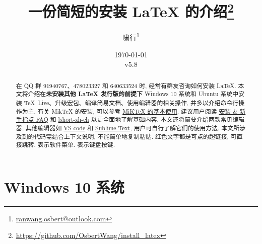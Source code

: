\documentclass{ctexrep}
\title{\bfseries 一份简短的安装 \LaTeX{} 的介绍\thanks{\url{https://github.com/OsbertWang/install_latex}}}
\author{啸行\thanks{\url{ranwang.osbert@outlook.com}}}
\date{%
  \today\\[1\ccwd]
  v5.8
}
\begin{document}
  
\maketitle

\begin{abstract}
在 QQ 群 91940767、478023327 和 640633524 时, 经常有群友咨询如何安装 \LaTeX.
本文将介绍在\textbf{未安装其他 \LaTeX{} 发行版的前提下} Windows 10 系统和 Ubuntu 系统中安装 \TeX{}~Live、升级宏包、编译简易文档、使用编辑器的相关操作, 并多以介绍命令行操作为主.
有关 Mik\TeX{} 的安装, 可以参考 \href{https://camuseblog.top/2019-03-02-/MiKTeX/}{MiK\TeX{} 的基本使用}.
建议用户阅读 \href{http://www.latexstudio.net/archives/11469.html}{\LaTeXe{} 安装 \& 新手指点 FAQ} 和 \href{http://mirrors.ctan.org/info/lshort/chinese/lshort-zh-cn.pdf}{lshort-zh-ch} 以更全面地了解基础内容.
本文还将简要介绍两款常见编辑器, 其他编辑器如 \href{https://github.com/EthanDeng/vscode-latex}{VS code} 和 \href{https://github.com/EthanDeng/sublime-text-latex}{Sublime Text}, 用户可自行了解它们的使用方法.
本文所涉及到的代码需结合上下文说明, 不能简单地复制粘贴.
红色文字都是可点的超链接, 可直接跳转.
 表示软件菜单.
 表示键盘按键.
\end{abstract}

\tableofcontents

\chapter{Windows 10 系统}
\end{document}
